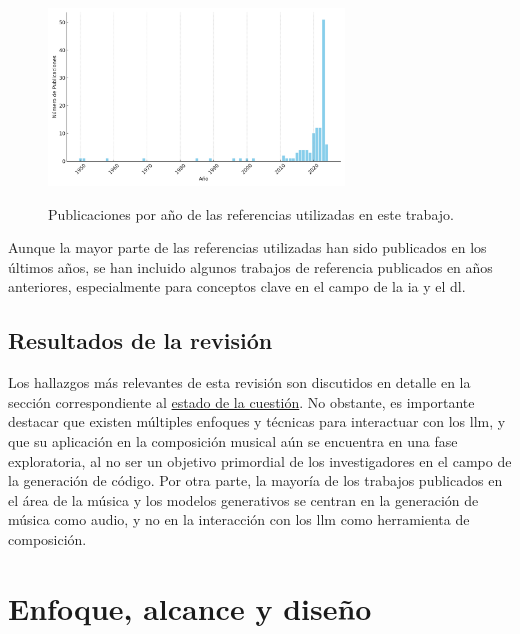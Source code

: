 \begin{figure}[h]
    \caption[Publicaciones por año de las referencias utilizadas]{Publicaciones por año de las referencias utilizadas en este trabajo.}
    \centering
    \includegraphics[width=0.7\textwidth]{./figuras/publications_per_year_referencias.png}
    \source{\propio}
    \label{fig:publications_per_year_referencias}
\end{figure}

Aunque la mayor parte de las referencias utilizadas han sido publicados en los últimos años, se han incluido algunos trabajos de referencia publicados en años anteriores, especialmente para conceptos clave en el campo de la \gls{ia} y el \gls{dl}.

\subsection{Resultados de la revisión}
Los hallazgos más relevantes de esta revisión son discutidos en detalle en la sección correspondiente al \hyperref[chap:estado_cuestion]{estado de la cuestión}. No obstante, es importante destacar que existen múltiples enfoques y técnicas para interactuar con los \gls{llm}, y que su aplicación en la composición musical aún se encuentra en una fase exploratoria, al no ser un objetivo primordial de los investigadores en el campo de la generación de código. Por otra parte, la mayoría de los trabajos publicados en el área de la música y los modelos generativos se centran en la generación de música como audio, y no en la interacción con los \gls{llm} como herramienta de composición. 

\section{Enfoque, alcance y diseño}

